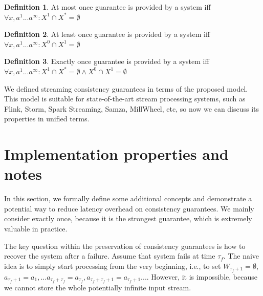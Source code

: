 \documentclass[sigconf]{acmart}
\theoremstyle{definition}
\newtheorem{definition}{Definition}
\begin{document}
\begin{definition}{At most once}
guarantee is provided by a system iff $\forall{x,a^{1}...a^\infty}:X^{1}\cap{X^{*}}=\emptyset$
\end{definition}

\begin{definition}{At least once}
guarantee is provided by a system iff $\forall{x,a^{1}...a^\infty}:X^{0}\cap{X^{1}}=\emptyset$
\end{definition}

\begin{definition}{Exactly once}
guarantee is provided by a system iff $\forall{x,a^{1}...a^\infty}:X^{1}\cap{X^{*}}=\emptyset \wedge X^{0}\cap{X^{1}}=\emptyset$
\end{definition}


We defined streaming consistency guarantees in terms of the proposed model. This model is suitable for state-of-the-art stream processing systems, such as Flink, Storm, Spark Streaming, Samza, MillWheel, etc, so now we can discuss its properties in unified terms.

\section{Implementation properties and notes}

In this section, we formally define some additional concepts and demonstrate a potential way to reduce latency overhead on consistency guarantees. We mainly consider exactly once, because it is the strongest guarantee, which is extremely valuable in practice.	

The key question within the preservation of consistency guarantees is how to recover the system after a failure. Assume that system fails at time $\tau_f$. The naive idea is to simply start processing from the very beginning, i.e., to set $W_{\tau_f+1}=\emptyset$, $a_{\tau_f+1}=a_1,...a_{\tau_f+\tau_f}=a_{\tau_f},a_{\tau_f+\tau_f+1}=a_{\tau_f+1}...$. However, it is impossible, because we cannot store the whole potentially infinite input stream.
\end{document}
